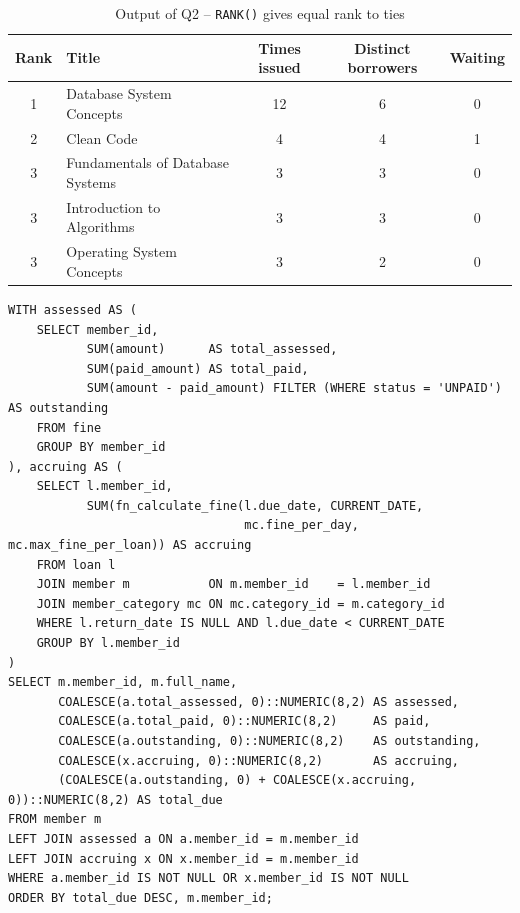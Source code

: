 \documentclass[11pt,a4paper]{report}
\begin{document}
\begin{table}[H]
    \centering
    \caption{Output of Q2 -- \texttt{RANK()} gives equal rank to ties}
    \footnotesize
    \begin{tabular}{|c|l|c|c|c|}
        \hline
        \textbf{Rank} & \textbf{Title} & \textbf{Times issued} & \textbf{Distinct borrowers} & \textbf{Waiting} \\ \hline
        1 & Database System Concepts & 12 & 6 & 0 \\ \hline
        2 & Clean Code & 4 & 4 & 1 \\ \hline
        3 & Fundamentals of Database Systems & 3 & 3 & 0 \\ \hline
        3 & Introduction to Algorithms & 3 & 3 & 0 \\ \hline
        3 & Operating System Concepts & 3 & 2 & 0 \\ \hline
    \end{tabular}
\end{table}

\begin{lstlisting}[caption={Q3 -- Member-wise fines: assessed, paid, outstanding and still accruing}, label={lst:q3}]
WITH assessed AS (
    SELECT member_id,
           SUM(amount)      AS total_assessed,
           SUM(paid_amount) AS total_paid,
           SUM(amount - paid_amount) FILTER (WHERE status = 'UNPAID') AS outstanding
    FROM fine
    GROUP BY member_id
), accruing AS (
    SELECT l.member_id,
           SUM(fn_calculate_fine(l.due_date, CURRENT_DATE,
                                 mc.fine_per_day, mc.max_fine_per_loan)) AS accruing
    FROM loan l
    JOIN member m           ON m.member_id    = l.member_id
    JOIN member_category mc ON mc.category_id = m.category_id
    WHERE l.return_date IS NULL AND l.due_date < CURRENT_DATE
    GROUP BY l.member_id
)
SELECT m.member_id, m.full_name,
       COALESCE(a.total_assessed, 0)::NUMERIC(8,2) AS assessed,
       COALESCE(a.total_paid, 0)::NUMERIC(8,2)     AS paid,
       COALESCE(a.outstanding, 0)::NUMERIC(8,2)    AS outstanding,
       COALESCE(x.accruing, 0)::NUMERIC(8,2)       AS accruing,
       (COALESCE(a.outstanding, 0) + COALESCE(x.accruing, 0))::NUMERIC(8,2) AS total_due
FROM member m
LEFT JOIN assessed a ON a.member_id = m.member_id
LEFT JOIN accruing x ON x.member_id = m.member_id
WHERE a.member_id IS NOT NULL OR x.member_id IS NOT NULL
ORDER BY total_due DESC, m.member_id;
\end{lstlisting}
\end{document}
